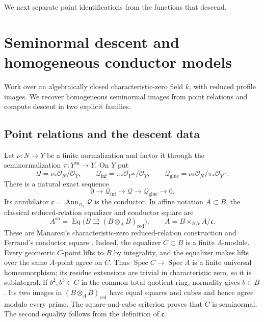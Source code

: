 \documentclass[10pt,fleqn]{article}
\numberwithin{equation}{section}
\newcommand{\Spec}{\operatorname{Spec}}
\begin{document}
We next separate point identifications from the functions that descend.


\section{Seminormal descent and homogeneous conductor models}
\label{v6:cond:section}\label{v7:sec:descent}

Work over an algebraically closed characteristic-zero field $k$, with
reduced profile images.  We recover homogeneous seminormal images from
point relations and compute descent in two explicit families.

\subsection{Point relations and the descent data}
\label{r21:descent:point-data}

Let $\nu:N\to Y$ be a finite normalization and factor it through the
seminormalization $\pi:Y^{\mathrm{sn}}\to Y$.  On $Y$ put
\begin{equation}\label{v7:descent:layers}
 \mathcal Q=\nu_*\mathcal O_N/\mathcal O_Y,\qquad
 \mathcal Q_{\mathrm{inf}}=\pi_*\mathcal O_{Y^{\mathrm{sn}}}/\mathcal O_Y,
 \qquad
 \mathcal Q_{\mathrm{glue}}=\nu_*\mathcal O_N/\pi_*\mathcal O_{Y^{\mathrm{sn}}}.
\end{equation}
There is a natural exact sequence
\begin{equation}\label{v7:descent:extension}
 0\longrightarrow\mathcal Q_{\mathrm{inf}}
 \longrightarrow\mathcal Q\longrightarrow\mathcal Q_{\mathrm{glue}}
 \longrightarrow0.
\end{equation}
Its annihilator $\mathfrak c=\operatorname{Ann}_{\mathcal O_Y}\mathcal Q$
is the conductor.  In affine notation $A\subset B$, the classical
reduced-relation equalizer and conductor square are
\begin{equation}\label{v7:descent:classical}
 A^{\mathrm{sn}}=
 \operatorname{Eq}\bigl(B\rightrightarrows(B\otimes_A B)_{\mathrm{red}}\bigr),
 \qquad
 A=B\mathop{\times}_{B/\mathfrak c}A/\mathfrak c.
\end{equation}
These are Manaresi's characteristic-zero reduced-relation construction
\cite[Theorem I.6 and Remark I.7]{Manaresi} and Ferrand's
conductor square \cite[Lemma 1.3]{Ferrand}.  Indeed, the equalizer $C\subset B$ is a finite
$A$-module.  Every geometric $C$-point lifts to $B$ by integrality,
and the equalizer makes lifts over the same $A$-point agree on $C$.
Thus $\Spec C\to\Spec A$ is a finite universal homeomorphism; its
residue extensions are trivial in characteristic zero, so it is
subintegral.  If $b^2,b^3\in C$ in the common total quotient ring,
normality gives $b\in B$.  Its two images in
$(B\otimes_A B)_{\mathrm{red}}$ have equal squares and cubes and hence
agree modulo every prime.  The square-and-cube criterion proves that
$C$ is seminormal.  The second equality follows from the definition of
$\mathfrak c$.
\end{document}

